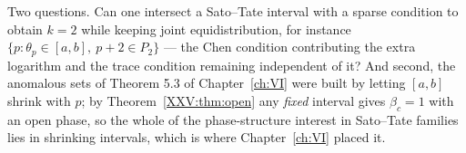Two questions. Can one intersect a Sato--Tate interval with a sparse condition to obtain
$k=2$ while keeping joint equidistribution, for instance
$\{p:\theta_p\in[a,b],\ p+2\in P_2\}$ --- the Chen condition contributing the extra logarithm
and the trace condition remaining independent of it? And second, the anomalous sets of
Theorem 5.3 of Chapter~\ref{ch:VI} were built by letting $[a,b]$ shrink with $p$; by
Theorem~\ref{XXV:thm:open} any \emph{fixed} interval gives $\beta_c=1$ with an open phase, so the
whole of the phase-structure interest in Sato--Tate families lies in shrinking intervals,
which is where Chapter~\ref{ch:VI} placed it.

